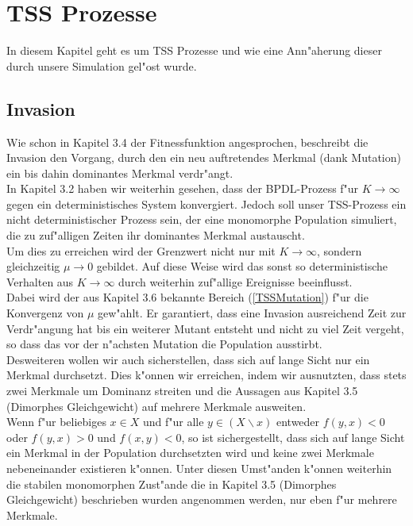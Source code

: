 \documentclass[11pt, a4paper, german]{article}
\theoremstyle{plain}
\begin{document}
	
\clearpage
\section{TSS Prozesse}
In diesem Kapitel geht es um TSS Prozesse und wie eine Ann"aherung dieser durch unsere Simulation gel"ost wurde.
	\subsection{Invasion}
	Wie schon in Kapitel 3.4 der Fitnessfunktion angesprochen, beschreibt die Invasion den Vorgang, durch den ein neu auftretendes Merkmal (dank Mutation) ein bis dahin dominantes Merkmal verdr"angt.\\
	In Kapitel 3.2 haben wir weiterhin gesehen, dass der BPDL-Prozess f"ur $ K \to \infty $ gegen ein deterministisches System konvergiert. Jedoch soll unser TSS-Prozess ein nicht deterministischer Prozess sein, der eine monomorphe Population simuliert, die zu zuf"alligen Zeiten ihr dominantes Merkmal austauscht.\\
	Um dies zu erreichen wird der Grenzwert nicht nur mit $ K \to \infty $, sondern gleichzeitig $ \mu \to 0 $ gebildet. Auf diese Weise wird das sonst so deterministische Verhalten aus $ K \to \infty $ durch weiterhin zuf"allige Ereignisse beeinflusst.\\
	Dabei wird der aus Kapitel 3.6 bekannte Bereich (\ref{TSSMutation}) f"ur die Konvergenz von $ \mu $ gew"ahlt. Er garantiert, dass eine Invasion ausreichend Zeit zur Verdr"angung hat bis ein weiterer Mutant entsteht und nicht zu viel Zeit vergeht, so dass das vor der n"achsten Mutation die Population ausstirbt.\\
	Desweiteren wollen wir auch sicherstellen, dass sich auf lange Sicht nur ein Merkmal durchsetzt. Dies k"onnen wir erreichen, indem wir ausnutzten, dass stets zwei Merkmale um Dominanz streiten und die Aussagen aus Kapitel 3.5 (Dimorphes Gleichgewicht) auf mehrere Merkmale ausweiten.\\
	Wenn f"ur beliebiges $ x \in X $ und f"ur alle $ y \in (X\backslash x) $ entweder $ f(y,x) < 0 $ oder $ f(y,x) > 0 $ und $ f(x,y) < 0 $, so ist sichergestellt, dass sich auf lange Sicht ein Merkmal in der Population durchsetzten wird und keine zwei Merkmale nebeneinander existieren k"onnen. Unter diesen Umst"anden k"onnen weiterhin die stabilen monomorphen Zust"ande die in Kapitel 3.5 (Dimorphes Gleichgewicht) beschrieben wurden angenommen werden, nur eben f"ur mehrere Merkmale.\\
	
\end{document}
